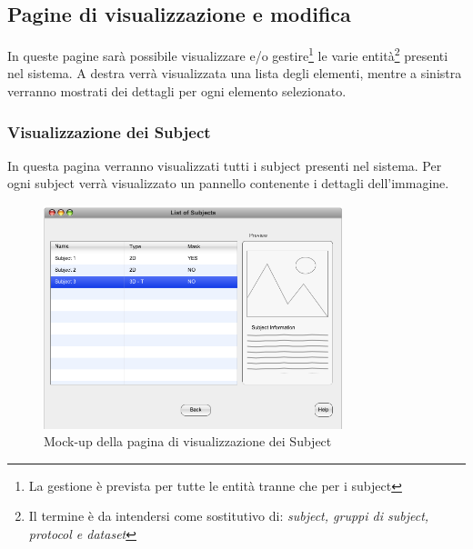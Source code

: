 \subsection{Pagine di visualizzazione e modifica}
In queste pagine sarà possibile visualizzare e/o gestire\footnote{La gestione è prevista per tutte le entità tranne che per i subject\glossario{}} le varie entità\footnote{Il termine è da intendersi come sostitutivo di: \textit{subject\glossario{}, gruppi di subject\glossario{}, protocol\glossario{} e dataset\glossario{}} } presenti nel sistema.
A destra verrà visualizzata una lista degli elementi, mentre a sinistra verranno mostrati dei dettagli per ogni elemento selezionato.

\subsubsection{Visualizzazione dei Subject}
In questa pagina verranno visualizzati tutti i subject\glossario{} presenti nel sistema. Per ogni subject\glossario{} verrà visualizzato un pannello contenente i dettagli dell'immagine.
\begin{figure}[htp]
	\centering
	\includegraphics[width=0.75\linewidth,height=6.5cm]{./Content/Immagini/Prototype-v0.1/filesystemdoc_8_3}
	\caption{Mock-up della pagina di visualizzazione dei Subject}
	\label{view_subject}
\end{figure}

